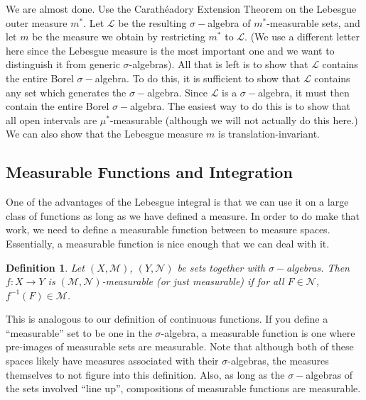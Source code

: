 \documentclass[12pt]{amsart}         %
\newtheorem{definition}{Definition}[section]
\theoremstyle{remark}
\begin{document}
We are almost done. Use the Carath\'{e}adory Extension Theorem on the Lebesgue outer measure $m^*$. Let $\mathcal{L}$ be the resulting $\sigma-$algebra of $m^*$-measurable sets, and let $m$ be the measure we obtain by restricting $m^*$ to $\mathcal{L}$. (We use a different letter here since the Lebesgue measure is the most important one and we want to distinguish it from generic $\sigma$-algebras). All that is left is to show that $\mathcal{L}$ contains the entire Borel $\sigma-$algebra. To do this, it is sufficient to show that $\mathcal{L}$ contains any set which generates the $\sigma-$algebra. Since $\mathcal{L}$ is a $\sigma-$algebra, it must then contain the entire Borel $\sigma-$algebra. 
The easiest way to do this is to show that all open intervals are $\mu^*$-measurable (although we will not actually do this here.) We can also show that the Lebesgue measure $m$ is translation-invariant.

\subsection{Measurable Functions and Integration}

One of the advantages of the Lebesgue integral is that we can use it on a large class of functions as long as we have defined a measure. In order to do make that work, we need to define a measurable function between to measure spaces. Essentially, a measurable function is nice enough that we can deal with it.

\begin{definition}
Let $(X,\mathcal{M})$, $(Y,\mathcal{N})$ be sets together with $\sigma-$algebras. Then $f: X \to Y$ is \emph{$(\mathcal{M},\mathcal{N})$-measurable} (or just \emph{measurable}) if for all $F \in \mathcal{N}$, $f^{-1}(F) \in \mathcal{M}$. 
\end{definition}

This is analogous to our definition of continuous functions. If you define a ``measurable'' set to be one in the $\sigma$-algebra, a measurable function is one where pre-images of measurable sets are measurable. Note that although both of these spaces likely have measures associated with their $\sigma$-algebras, the measures themselves to not figure into this definition. Also, as long as the $\sigma-$algebras of the sets involved ``line up'', compositions of measurable functions are measurable.
\end{document}
